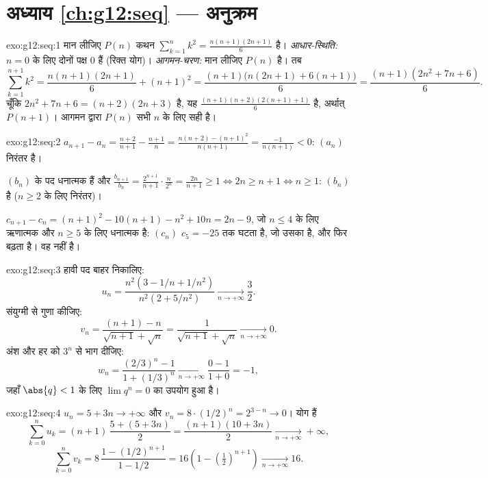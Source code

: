 \section*{अध्याय \ref{ch:g12:seq} --- अनुक्रम}

\begin{solution}{exo:g12:seq:1}
मान लीजिए $P(n)$ कथन $\sum_{k=1}^{n} k^2 = \frac{n(n+1)(2n+1)}{6}$ है।
\emph{आधार-स्थिति:} $n = 0$ के लिए दोनों पक्ष $0$ हैं (रिक्त योग)।
\emph{आगमन-चरण:} मान लीजिए $P(n)$ है। तब
\[
\sum_{k=1}^{n+1} k^2 = \frac{n(n+1)(2n+1)}{6} + (n+1)^2
= \frac{(n+1)\bigl(n(2n+1) + 6(n+1)\bigr)}{6}
= \frac{(n+1)(2n^2 + 7n + 6)}{6}.
\]
चूँकि $2n^2 + 7n + 6 = (n+2)(2n+3)$ है, यह $\frac{(n+1)(n+2)(2(n+1)+1)}{6}$ है, अर्थात् $P(n+1)$। आगमन द्वारा $P(n)$ सभी $n$ के लिए सही
है।
\end{solution}

\begin{solution}{exo:g12:seq:2}
$a_{n+1} - a_n = \frac{n+2}{n+1} - \frac{n+1}{n}
= \frac{n(n+2) - (n+1)^2}{n(n+1)} = \frac{-1}{n(n+1)} < 0$: $(a_n)$ निरंतर  है।

$(b_n)$ के पद धनात्मक हैं और $\frac{b_{n+1}}{b_n} = \frac{2^{n+1}}{n+1}\cdot\frac{n}{2^n} =
\frac{2n}{n+1} \geq 1 \iff 2n \geq n+1 \iff n \geq 1$: $(b_n)$  है ($n \geq 2$ के लिए निरंतर)।

$c_{n+1} - c_n = (n+1)^2 - 10(n+1) - n^2 + 10n = 2n - 9$, जो $n \leq 4$ के लिए ऋणात्मक और $n \geq 5$ के लिए धनात्मक है: $(c_n)$ $c_5 = -25$ तक घटता है,
जो उसका  है, और फिर बढ़ता है। वह  नहीं है।
\end{solution}

\begin{solution}{exo:g12:seq:3}
हावी पद बाहर निकालिए:
\[
u_n = \frac{n^2(3 - 1/n + 1/n^2)}{n^2(2 + 5/n^2)} \xrightarrow[n\to+\infty]{} \frac{3}{2}.
\]
संयुग्मी से गुणा कीजिए:
\[
v_n = \frac{(n+1) - n}{\sqrt{n+1} + \sqrt{n}} = \frac{1}{\sqrt{n+1}+\sqrt{n}}
\xrightarrow[n\to+\infty]{} 0.
\]
अंश और हर को $3^n$ से भाग दीजिए:
\[
w_n = \frac{(2/3)^n - 1}{1 + (1/3)^n} \xrightarrow[n\to+\infty]{} \frac{0-1}{1+0} = -1,
\]
जहाँ $\abs{q} < 1$ के लिए $\lim q^n = 0$ का उपयोग हुआ है।
\end{solution}

\begin{solution}{exo:g12:seq:4}
$u_n = 5 + 3n \to +\infty$ और $v_n = 8 \cdot (1/2)^n = 2^{3-n} \to 0$। योग हैं
\[
\sum_{k=0}^{n} u_k = (n+1)\,\frac{5 + (5+3n)}{2} = \frac{(n+1)(10+3n)}{2}
\xrightarrow[n\to+\infty]{} +\infty,
\]
\[
\sum_{k=0}^{n} v_k = 8\,\frac{1 - (1/2)^{n+1}}{1 - 1/2}
= 16\left(1 - \left(\tfrac{1}{2}\right)^{n+1}\right)
\xrightarrow[n\to+\infty]{} 16 .
\]
\end{solution}


